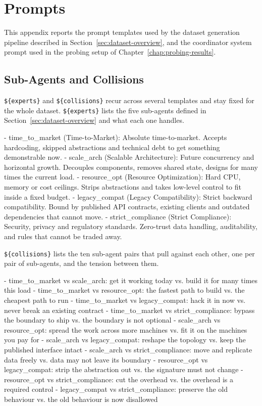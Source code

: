 \chapter{Prompts}
\label{chap:appendix-prompts}

This appendix reports the prompt templates used by the dataset generation pipeline described in Section~\ref{sec:dataset-overview}, and the coordinator system prompt used in the probing setup of Chapter~\ref{chap:probing-results}.

\section{Sub-Agents and Collisions}
\label{sec:appendix-taxonomy}

\texttt{\$\{experts\}} and \texttt{\$\{collisions\}} recur across several templates and stay fixed for the whole dataset. \texttt{\$\{experts\}} lists the five sub-agents defined in Section~\ref{sec:dataset-overview} and what each one handles.

\begin{promptverbatim}
- time_to_market (Time-to-Market): Absolute time-to-market. Accepts hardcoding, skipped abstractions and technical debt to get something demonstrable now.
- scale_arch (Scalable Architecture): Future concurrency and horizontal growth. Decouples components, removes shared state, designs for many times the current load.
- resource_opt (Resource Optimization): Hard CPU, memory or cost ceilings. Strips abstractions and takes low-level control to fit inside a fixed budget.
- legacy_compat (Legacy Compatibility): Strict backward compatibility. Bound by published API contracts, existing clients and outdated dependencies that cannot move.
- strict_compliance (Strict Compliance): Security, privacy and regulatory standards. Zero-trust data handling, auditability, and rules that cannot be traded away.
\end{promptverbatim}

\texttt{\$\{collisions\}} lists the ten sub-agent pairs that pull against each other, one per pair of sub-agents, and the tension between them.

\begin{promptverbatim}
- time_to_market vs scale_arch: get it working today vs. build it for many times this load
- time_to_market vs resource_opt: the fastest path to build vs. the cheapest path to run
- time_to_market vs legacy_compat: hack it in now vs. never break an existing contract
- time_to_market vs strict_compliance: bypass the boundary to ship vs. the boundary is not optional
- scale_arch vs resource_opt: spread the work across more machines vs. fit it on the machines you pay for
- scale_arch vs legacy_compat: reshape the topology vs. keep the published interface intact
- scale_arch vs strict_compliance: move and replicate data freely vs. data may not leave its boundary
- resource_opt vs legacy_compat: strip the abstraction out vs. the signature must not change
- resource_opt vs strict_compliance: cut the overhead vs. the overhead is a required control
- legacy_compat vs strict_compliance: preserve the old behaviour vs. the old behaviour is now disallowed
\end{promptverbatim}

